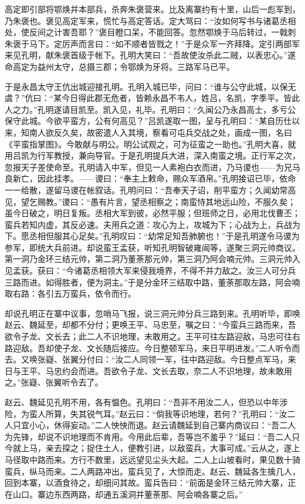 高定即引部将鄂焕并本部兵，杀奔朱褒营来。比及离寨约有十里，山后一彪军到，乃朱褒也。褒见高定军来，慌忙与高定答话。定大骂曰：“汝如何写书与诸葛丞相处，使反间之计害吾耶？”褒目瞪口呆，不能回答。忽然鄂焕于马后转过，一戟刺朱褒于马下。定厉声而言曰：“如不顺者皆戮之！”于是众军一齐拜降。定引两部军来见孔明，献朱褒首级于帐下。孔明大笑曰：“吾故使汝杀此二贼，以表忠心。”遂命高定为益州太守，总摄三郡；令鄂焕为牙将。三路军马已平。

于是永昌太守王伉出城迎接孔明。孔明入城已毕，问曰：“谁与公守此城，以保无虞？”伉曰：“某今日得此郡无危者，皆赖永昌不韦人，姓吕，名凯，字季平。皆此人之力。”孔明遂请目凯至。凯入见，礼毕。孔明曰：“久闻公乃永昌高士，多亏公保守此城。今欲平蛮方，公有何高见？”吕凯遂取一图，呈与孔明曰：“某自历仕以来，知南人欲反久矣，故密遣人入其境，察看可屯兵交战之处，画成一图，名曰《平蛮指掌图》。今敢献与明公。明公试观之，可为征蛮之一助也。”孔明大喜，就用吕凯为行军教授，兼向导官。于是孔明提兵大进，深入南蛮之境。正行军之次，忽报天子差使命至。孔明请入中军，但见一人素袍白衣而进，乃马谡也——为兄马良新亡，因此挂孝。——谡曰：“奉主上敕命，赐众军酒帛。”孔明接诏已毕，依命一一给散，遂留马谡在帐叙话。孔明问曰：“吾奉天子诏，削平蛮方；久闻幼常高见，望乞赐教。”谡曰：“愚有片言，望丞相察之；南蛮恃其地远山险，不服久矣；虽今日破之，明日复叛。丞相大军到彼，必然平服；但班师之日，必用北伐曹丕；蛮兵若知内虚，其反必速。夫用兵之道：攻心为上，攻城为下；心战为上，兵战为下。愿丞相但服其心足矣。”孔明叹曰：“幼常足知吾肺腑也！”于是孔明遂令马谡为参军，即统大兵前进。却说蛮王孟获，听知孔明智破雍闿等，遂聚三洞元帅商议。第一洞乃金环三结元帅，第二洞乃董荼那元帅，第三洞乃阿会喃元帅。三洞元帅入见孟获。获曰：“今诸葛丞相领大军来侵我境界，不得不并力敌之。汝三人可分兵三路而进。如得胜者，便为洞主。”于是分金环三结取中路，董荼那取左路，阿会喃取右路：各引五万蛮兵，依令而行。

却说孔明正在寨中议事，忽哨马飞报，说三洞元帅分兵三路到来。孔明听毕，即唤赵云、魏延至，却都不分付；更唤王平、马忠至，嘱之曰：“今蛮兵三路而来，吾欲令子龙、文长去；此二人不识地理，未敢用之。王平可往左路迎敌，马忠可往右路迎敌。吾却使子龙、文长随后接应。今日整顿军马，来日平明进发。”二人听令而去。又唤张嶷、张翼分付曰：“汝二人同领一军，往中路迎敌。今日整点军马，来日与王平、马忠约会而进。吾欲令子龙、文长去取，奈二人不识地理，故未敢用之。”张嶷、张翼听令去了。

赵云、魏延见孔明不用，各有愠色。孔明曰：“吾非不用汝二人，但恐以中年涉险，为蛮人所算，失其锐气耳。”赵云曰：“倘我等识地理，若何？”孔明曰：“汝二人只宜小心，休得妄动。”二人怏怏而退。赵云请魏延到自己寨内商议曰：“吾二人为先锋，却说不识地理而不肯用。今用此后辈，吾等岂不羞乎？”延曰：“吾二人只今就上马，亲去探之；捉住土人，便教引进，以敌蛮兵，大事可成。”云从之，遂上马径取中路而来。方行不数里，远远望见尘头大起。二人上山坡看时，果见数十骑蛮兵，纵马而来。二人两路冲出。蛮兵见了，大惊而走。赵云、魏延各生擒几人，回到本寨，以酒食待之，却细问其故。蛮兵告曰：“前面是金环三结元帅大寨，正在山口。寨边东西两路，却通五溪洞并董荼那、阿会喃各寨之后。”

